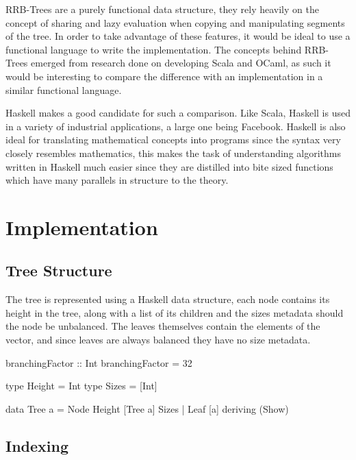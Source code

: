 \documentclass[11pt,a4paper,oneside]{article}
\begin{document}
RRB-Trees are a purely functional data structure, they rely heavily on the concept of sharing and lazy evaluation when copying and manipulating segments of the tree. In order to take advantage of these features, it would be ideal to use a functional language to write the implementation. The concepts behind RRB-Trees emerged from research done on developing Scala and OCaml, as such it would be interesting to compare the difference with an implementation in a similar functional language. 

Haskell makes a good candidate for such a comparison. Like Scala, Haskell is used in a variety of industrial applications, a large one being Facebook\citep{marlow2014haxl}. Haskell is also ideal for translating mathematical concepts into programs since the syntax very closely resembles mathematics, this makes the task of understanding algorithms written in Haskell much easier since they are distilled into bite sized functions which have many parallels in structure to the theory.

\section{Implementation}

\subsection{Tree Structure}

The tree is represented using a Haskell data structure, each node contains its height in the tree, along with a list of its children and the sizes metadata should the node be unbalanced. The leaves themselves contain the elements of the vector, and since leaves are always balanced they have no size metadata. 

\begin{haskell}

branchingFactor :: Int
branchingFactor = 32

type Height = Int
type Sizes = [Int]

data Tree a = Node Height [Tree a] Sizes | Leaf [a]
    deriving (Show)

\end{haskell}

\subsection{Indexing}
\end{document}
